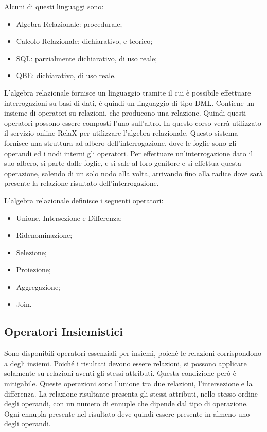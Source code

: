\documentclass{article}
\numberwithin{equation}{subsection}
\begin{document}
Alcuni di questi linguaggi sono:
\begin{itemize}
    \item Algebra Relazionale: procedurale;
    \item Calcolo Relazionale: dichiarativo, e teorico;
    \item SQL: parzialmente dichiarativo, di uso reale;
    \item QBE: dichiarativo, di uso reale. 
\end{itemize} 

L'algebra relazionale fornisce un linguaggio tramite il cui è possibile effettuare interrogazioni su basi di dati, è quindi un linguaggio di tipo DML. Contiene un insieme di operatori su relazioni, che producono 
una relazione. Quindi questi operatori possono essere composti l'uno sull'altro. 
In questo corso verrà utilizzato il servizio online RelaX per utilizzare l'algebra relazionale. Questo sistema fornisce una struttura ad albero dell'interrogazione, dove le foglie sono gli operandi ed i 
nodi interni gli operatori. Per effettuare un'interrogazione dato il suo albero, si parte dalle foglie, e si sale al loro genitore e si effettua questa operazione, salendo di un solo nodo alla volta, arrivando 
fino alla radice dove sarà presente la relazione risultato dell'interrogazione. 

L'algebra relazionale definisce i seguenti operatori:
\begin{itemize}
    \item Unione, Intersezione e Differenza;
    \item Ridenominazione;
    \item Selezione;
    \item Proiezione;
    \item Aggregazione;
    \item Join. 
\end{itemize}

\subsection{Operatori Insiemistici}

Sono disponibili operatori essenziali per insiemi, poiché le relazioni corrispondono a degli insiemi. Poiché i risultati devono essere relazioni, si possono applicare solamente su relazioni aventi gli stessi 
attributi. Questa condizione però è mitigabile. 
Queste operazioni sono l'unione tra due relazioni, l'intersezione e la differenza. La relazione risultante presenta gli stessi attributi, nello stesso ordine degli operandi, con un numero di ennuple che dipende 
dal tipo di operazione. Ogni ennupla presente nel risultato deve quindi essere presente in almeno uno degli operandi. 
\end{document}
